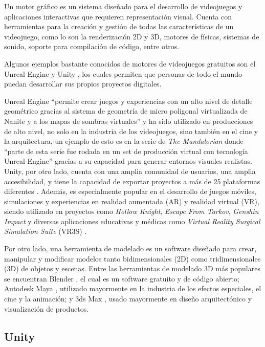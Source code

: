 Un motor gráfico es un sistema diseñado para el desarrollo de videojuegos y aplicaciones interactivas que requieren representación visual. Cuenta con herramientas para la creación y gestión de todas las características de un videojuego, como lo son la renderización 2D y 3D, motores de físicas, sistemas de sonido, soporte para compilación de código, entre otros.

Algunos ejemplos bastante conocidos de motores de videojuegos gratuitos son el Unreal Engine \autocite{unrealSite} y Unity \autocite{unitySite}, los cuales permiten que personas de todo el mundo puedan desarrollar sus propios proyectos digitales.

Unreal Engine “permite crear juegos y experiencias con un alto nivel de detalle geométrico gracias al sistema de geometría de micro poligonal virtualizada de Nanite y a los mapas de sombras virtuales” \autocite{unrealFeaturesNanite} y ha sido utilizado en producciones de alto nivel, no solo en la industria de los videojuegos, sino también en el cine y la arquitectura, un ejemplo de esto es en la serie de \textit{The Mandalorian} donde “parte de esta serie fue rodada en un set de producción virtual con tecnología Unreal Engine” \autocite{mandalorianMeristation2022} gracias a su capacidad para generar entornos visuales realistas. Unity, por otro lado, cuenta con una amplia comunidad de usuarios, una amplia accesibilidad, y tiene la capacidad de exportar proyectos a más de 25 plataformas diferentes \autocite{unitySite}. Además, es especialmente popular en el desarrollo de juegos móviles, simulaciones y experiencias en realidad aumentada (AR) y realidad virtual (VR), siendo utilizado en proyectos como \textit{Hollow Knight}, \textit{Escape From Tarkov}, \textit{Genshin Impact} y diversas aplicaciones educativas y médicas como \textit{Virtual Reality Surgical Simulation Suite} (VR3S) \autocite{vr3s}.

Por otro lado, una herramienta de modelado es un software diseñado para crear, manipular y modificar modelos tanto bidimensionales (2D) como tridimensionales (3D) de objetos y escenas. Entre las herramientas de modelado 3D más populares se encuentran Blender \autocite{blenderSite}, el cual es un software gratuito y de código abierto; Autodesk Maya \autocite{mayaSite}, utilizado mayormente en la industria de los efectos especiales, el cine y la animación; y 3ds Max \autocite{maxSite}, usado mayormente en diseño arquitectónico y visualización de productos.

\subsection{Unity}

